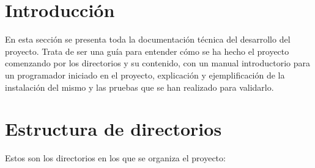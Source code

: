 
\section{Introducción}
En esta sección se presenta toda la documentación técnica del desarrollo del
proyecto. Trata de ser una guía para entender cómo se ha hecho el proyecto
comenzando por los directorios y su contenido, con un manual introductorio para
un programador iniciado en el proyecto, explicación y ejemplificación de la
instalación del mismo y las pruebas que se han realizado para validarlo.

\section{Estructura de directorios}
Estos son los directorios en los que se organiza el proyecto:

